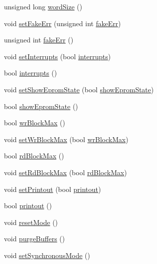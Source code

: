 \begin{DoxyCompactItemize}
\item 
unsigned long \hyperlink{classUsbFTMLInterface_ac313f412cbda6222ef817cb46083e2b3}{word\+Size} ()
\item 
void \hyperlink{classUsbFTMLInterface_a01a8080338c5de181ad70b7506c97bc4}{set\+Fake\+Err} (unsigned int \hyperlink{classUsbFTMLInterface_a0379dd75800521cea37580d68205f620}{fake\+Err})
\item 
unsigned int \hyperlink{classUsbFTMLInterface_a0379dd75800521cea37580d68205f620}{fake\+Err} ()
\item 
void \hyperlink{classUsbFTMLInterface_ac82eb9d63d4279998765dcc8c539bba9}{set\+Interrupts} (bool \hyperlink{classUsbFTMLInterface_afab1c2175bd2bca261ffa2b8ee67df2d}{interrupts})
\item 
bool \hyperlink{classUsbFTMLInterface_afab1c2175bd2bca261ffa2b8ee67df2d}{interrupts} ()
\item 
void \hyperlink{classUsbFTMLInterface_a051a6eb8e7fe43c9c97d61f8aafeea8e}{set\+Show\+Eprom\+State} (bool \hyperlink{classUsbFTMLInterface_aa62fc0edc39360eeb473fe9e91df9044}{show\+Eprom\+State})
\item 
bool \hyperlink{classUsbFTMLInterface_aa62fc0edc39360eeb473fe9e91df9044}{show\+Eprom\+State} ()
\item 
bool \hyperlink{classUsbFTMLInterface_a296da37a9d4c2d78338800ebc283bb80}{wr\+Block\+Max} ()
\item 
void \hyperlink{classUsbFTMLInterface_ab9ff3b850ed592872bd82c579052114f}{set\+Wr\+Block\+Max} (bool \hyperlink{classUsbFTMLInterface_a296da37a9d4c2d78338800ebc283bb80}{wr\+Block\+Max})
\item 
bool \hyperlink{classUsbFTMLInterface_ac0a393da12305baa111deb699f7190cb}{rd\+Block\+Max} ()
\item 
void \hyperlink{classUsbFTMLInterface_abdd0b79fb1d8a17c6a97969a291b858b}{set\+Rd\+Block\+Max} (bool \hyperlink{classUsbFTMLInterface_ac0a393da12305baa111deb699f7190cb}{rd\+Block\+Max})
\item 
void \hyperlink{classUsbFTMLInterface_a807c9a67253303a7bc1b14558b9819ac}{set\+Printout} (bool \hyperlink{classUsbFTMLInterface_a1045e3851406cf07e31c498d0de230e1}{printout})
\item 
bool \hyperlink{classUsbFTMLInterface_a1045e3851406cf07e31c498d0de230e1}{printout} ()
\item 
void \hyperlink{classUsbFTMLInterface_a91063d4374b617177c6b7a4022385dd1}{reset\+Mode} ()
\item 
void \hyperlink{classUsbFTMLInterface_ad5c6964b2618149f33c258f896e9f113}{purge\+Buffers} ()
\item 
void \hyperlink{classUsbFTMLInterface_a8aa032fbbaf9d0adbeea2d147d7c8a14}{set\+Synchronous\+Mode} ()
\end{DoxyCompactItemize}
